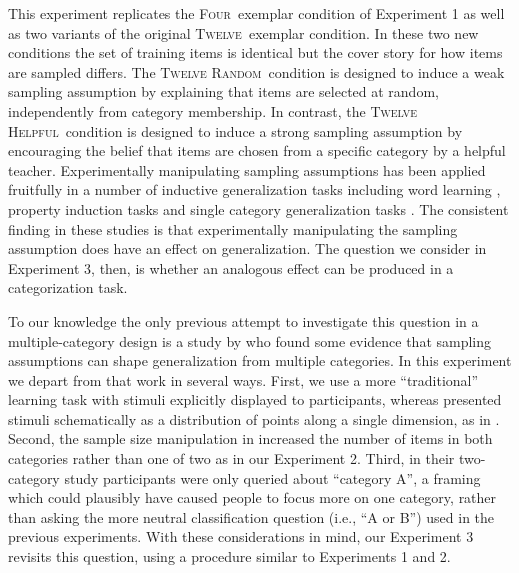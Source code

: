 \documentclass[doc,apacite]{apa6}
\newcommand{\four}{\textsc{Four}}
\newcommand{\twelve}{\textsc{Twelve}}
\newcommand{\random}{\textsc{Twelve Random}}
\newcommand{\helpful}{\textsc{Twelve Helpful}}
\begin{document}
This experiment replicates the \four\ exemplar condition of Experiment 1 as well as two variants of the original \twelve\ exemplar condition. In these two new conditions the set of training items is identical but the cover story for how items are sampled differs. The \random\ condition is designed to induce a weak sampling assumption by explaining that items are selected at random, independently from category membership.  In contrast, the \helpful\ condition is designed to induce a strong sampling assumption by encouraging the belief that items are chosen from a specific category by a helpful teacher. Experimentally manipulating sampling assumptions has been applied fruitfully in a number of inductive generalization tasks including word learning \cite{xu2007sensitivity}, property induction tasks \cite{ransom2016leaping,hayes2019diversity} and single category generalization tasks \cite{ransom2018representational, ransom2019samplingmemory}. The consistent finding in these studies is that experimentally manipulating the sampling assumption does have an effect on generalization. The question we consider in Experiment 3, then, is whether an analogous effect can be produced in a categorization task.

To our knowledge the only previous attempt to investigate this question in a multiple-category design is a study by  who found some evidence that sampling assumptions can shape generalization from multiple categories. In this experiment we depart from that work in several ways. First, we use a more ``traditional'' learning task with stimuli explicitly displayed to participants, whereas  presented stimuli schematically as a distribution of points along a single dimension, as in . Second, the sample size manipulation in  increased the number of items in both categories rather than one of two as in our Experiment 2. Third, in their two-category study participants were only queried about ``category A'', a framing which could plausibly have caused people to focus more on one category, rather than asking the more neutral classification question (i.e., ``A or B'') used in the previous experiments.  With these considerations in mind, our Experiment 3 revisits this question, using a procedure similar to Experiments 1 and 2.
\end{document}
